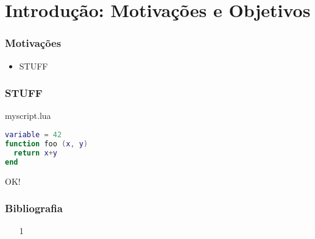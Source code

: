 \documentclass[brazil]{beamer}
\begin{document}
\section{Introdução: Motivações e Objetivos}
\begin{frame}[fragile]
  \frametitle{Motivações}
  \pause
  \vspace{-10pt}
  \begin{itemize}
    \pause
    \item STUFF
  \end{itemize}
\end{frame}
\begin{frame}[fragile]
  \frametitle{STUFF}
  \pause
  \begin{block}{myscript.lua}
    \begin{lstlisting}[language=lua]
variable = 42
function foo (x, y)
  return x+y
end
    \end{lstlisting}
  \end{block}
\end{frame}
\begin{frame}
  \begin{center}
    \LARGE OK!
  \end{center}
\end{frame}
\begin{frame}
  \frametitle{Bibliografia}
  \begin{itemize}
    \footnotesize
    \item[1]
    \vspace{1em}
  \end{itemize}
\end{frame}
\end{document}
